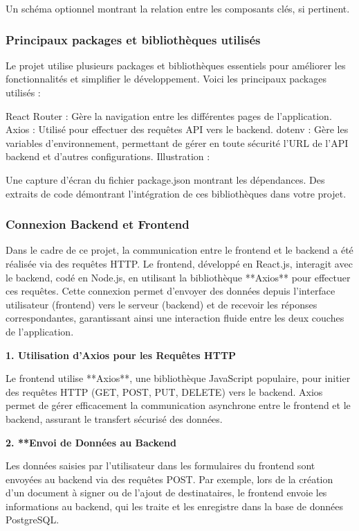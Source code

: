 Un schéma optionnel montrant la relation entre les composants clés, si pertinent. 


\subsubsection{Principaux packages et bibliothèques utilisés}
 

Le projet utilise plusieurs packages et bibliothèques essentiels pour améliorer les fonctionnalités et simplifier le développement. Voici les principaux packages utilisés :

React Router : Gère la navigation entre les différentes pages de l'application.
Axios : Utilisé pour effectuer des requêtes API vers le backend.
dotenv : Gère les variables d'environnement, permettant de gérer en toute sécurité l'URL de l'API backend et d'autres configurations.
Illustration :

Une capture d'écran du fichier package.json montrant les dépendances.
Des extraits de code démontrant l'intégration de ces bibliothèques dans votre projet.

\subsubsection{Connexion Backend et Frontend}

Dans le cadre de ce projet, la communication entre le frontend et le backend a été réalisée via des requêtes HTTP. Le frontend, développé en React.js, interagit avec le backend, codé en Node.js, en utilisant la bibliothèque **Axios** pour effectuer ces requêtes. Cette connexion permet d'envoyer des données depuis l'interface utilisateur (frontend) vers le serveur (backend) et de recevoir les réponses correspondantes, garantissant ainsi une interaction fluide entre les deux couches de l'application.

\textbf{1. Utilisation d'Axios pour les Requêtes HTTP }

Le frontend utilise **Axios**, une bibliothèque JavaScript populaire, pour initier des requêtes HTTP (GET, POST, PUT, DELETE) vers le backend. Axios permet de gérer efficacement la communication asynchrone entre le frontend et le backend, assurant le transfert sécurisé des données.


\textbf{2. **Envoi de Données au Backend}

Les données saisies par l'utilisateur dans les formulaires du frontend sont envoyées au backend via des requêtes POST. Par exemple, lors de la création d'un document à signer ou de l'ajout de destinataires, le frontend envoie les informations au backend, qui les traite et les enregistre dans la base de données PostgreSQL.

